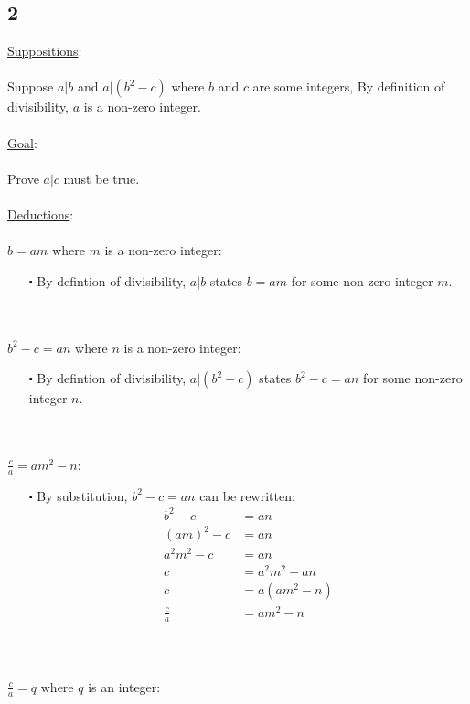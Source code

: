 \documentclass[12pt]{article}
\begin{document}
\subsection*{2}
\underline{Suppositions}:
\\ \\
Suppose $a|b$ and $a|(b^2 - c)$ where $b$ and $c$ are some integers, By definition of divisibility, $a$ is a non-zero integer. 
\\ \\
\underline{Goal}:
\\ \\
Prove $a|c$ must be true.
\\ \\
\underline{Deductions}:
\\ \\
$b=am$ where $m$ is a non-zero integer:
\begin{itemize}
  \item  [$\centerdot$] By defintion of divisibility, $a|b$ states $b=am$ for some non-zero integer $m$.
\end{itemize}
\newblock
\\ \\
$b^2-c=an$ where $n$ is a non-zero integer:
\begin{itemize}
  \item  [$\centerdot$] By defintion of divisibility, $a|(b^2-c)$ states $b^2-c=an$ for some non-zero integer $n$.
\end{itemize}
\newblock
\\ \\
$\frac{c}{a} = am^2 - n$:
\begin{itemize}
  \item  [$\centerdot$] By substitution, $b^2-c=an$ can be rewritten:
  \begin{align*}
    b^2-c&=an\\ 
    (am)^2-c&=an \\
    a^2m^2-c&=an \\
    c &= a^2m^2 - an\\
    c &= a(am^2 - n)\\
    \frac{c}{a} &= am^2 - n\\
  \end{align*}
\end{itemize}
\newblock 
\\ \\
$\frac{c}{a}=q$ where $q$ is an integer:
\end{document}
